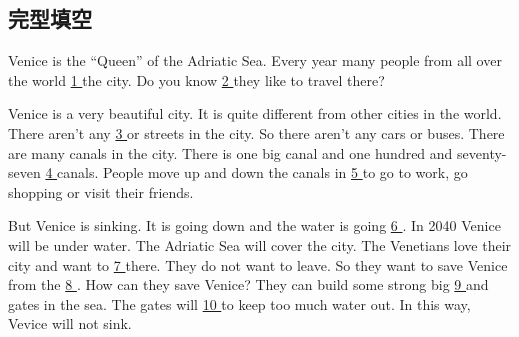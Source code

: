 \subsection{完型填空}
\item{
    Venice is the ``Queen'' of the Adriatic Sea. Every year many people from all over the world \underline{ 1 } the city. Do you know \underline{ 2 } they like to travel there?

    \hspace{2em} 
    Venice is a very beautiful city. It is quite different from other cities in the world. There aren't any \underline{ 3 } or streets in the city. So there aren't any cars or buses. There are many canals in the city. There is one big canal and one hundred and seventy-seven \underline{ 4 } canals. People move up and down the canals in  \underline{ 5 } to go to work, go shopping or visit their friends.
    
    \hspace{2em}
    But Venice is sinking. It is going down and the water is going \underline{ 6 }. In 2040 Venice will be under water. The Adriatic Sea will cover the city. The Venetians love their city and want to  \underline{ 7 } there. They do not want to leave. So they want to save Venice from the \underline{ 8 }. How can they save Venice? They can build some strong big \underline{ 9 } and gates in the sea. The gates will \underline{ 10 } to keep too much water out. In this way, Vevice will not sink.

}
